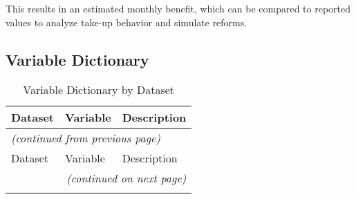 This results in an estimated monthly benefit, which can be compared to reported values to analyze take-up behavior and simulate reforms.

\subsection{Variable Dictionary}

\begin{longtable}{lll}
\caption{Variable Dictionary by Dataset} \\
\toprule
Dataset & Variable & Description \\
\midrule
\endfirsthead

\multicolumn{3}{l}{\textit{(continued from previous page)}} \\
\toprule
Dataset & Variable & Description \\
\midrule
\endhead

\bottomrule
\multicolumn{3}{r}{\textit{(continued on next page)}} \\
\endfoot

\bottomrule
\endlastfoot


\end{longtable}
